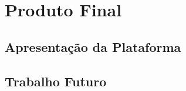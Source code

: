 \chapter{Produto Final}
\label{sec:produto-final}

\section{Apresentação da Plataforma}
\section{Trabalho Futuro}

\blankpage

\glsresetall
